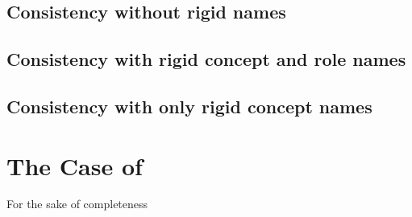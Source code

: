 \missingproof


\subsection{Consistency without rigid names}
\label{sec:cons-without-rigid}

\subsection{Consistency with rigid concept and role names}
\label{sec:cons-with-rigid}




\subsection{Consistency with only rigid concept names}
\label{sec:cons-with-only}



\section{The Case of \EL}
\label{sec:case-el}

For the sake of completeness 



\missingproof


